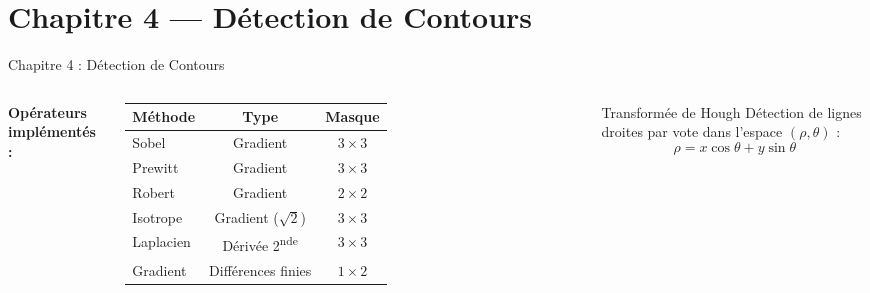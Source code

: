 \documentclass[aspectratio=169, 11pt]{beamer}
\begin{document}
\section{Chapitre 4 — Détection de Contours}

\begin{frame}{Chapitre 4 : Détection de Contours}
  \begin{columns}[T]
    \textbf{\textcolor{uy1blue}{Opérateurs implémentés :}}
    \vspace{4pt}

    \begin{tabular}{lcc}
      \toprule
      \textbf{Méthode} & \textbf{Type} & \textbf{Masque} \\
      \midrule
      Sobel & Gradient & $3 \times 3$ \\
      Prewitt & Gradient & $3 \times 3$ \\
      Robert & Gradient & $2 \times 2$ \\
      Isotrope & Gradient ($\sqrt{2}$) & $3 \times 3$ \\
      Laplacien & Dérivée 2\textsuperscript{nde} & $3 \times 3$ \\
      Gradient & Différences finies & $1 \times 2$ \\
      \bottomrule
    \end{tabular}
    \vspace{6pt}

    \begin{exampleblock}{Transformée de Hough}
      Détection de lignes droites par vote dans l'espace $(\rho, \theta)$ :
      \[ \rho = x\cos\theta + y\sin\theta \]
    \end{exampleblock}

  \end{columns}
\end{frame}
\end{document}
